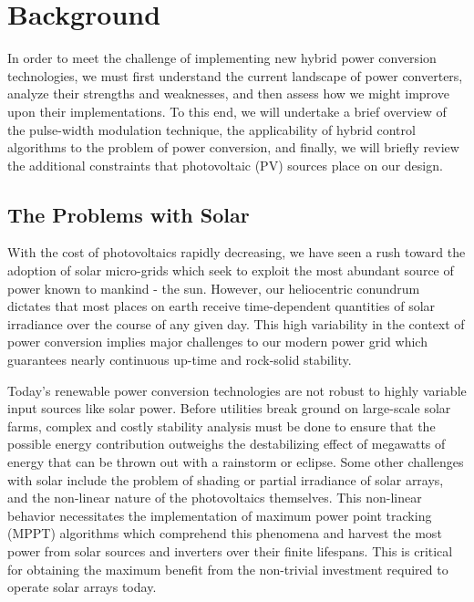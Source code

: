 \section{Background}
In order to meet the challenge of implementing new hybrid power conversion technologies, we must first understand the current landscape of power converters, analyze their strengths and weaknesses, and then assess how we might improve upon their implementations. To this end, we will undertake a brief overview of the pulse-width modulation technique, the applicability of hybrid control algorithms to the problem of power conversion, and finally, we will briefly review the additional constraints that photovoltaic (PV) sources place on our design. 

\subsection{The Problems with Solar}
With the cost of photovoltaics rapidly decreasing, we have seen a rush toward the adoption of solar micro-grids which seek to exploit the most abundant source of power known to mankind - the sun. However, our heliocentric conundrum dictates that most places on earth receive time-dependent quantities of solar irradiance over the course of any given day. This high variability in the context of power conversion implies major challenges to our modern power grid which guarantees nearly continuous up-time and rock-solid stability. 

Today's renewable power conversion technologies are not robust to highly variable input sources like solar power. Before utilities break ground on large-scale solar farms, complex and costly stability analysis must be done to ensure that the possible energy contribution outweighs the destabilizing effect of megawatts of energy that can be thrown out with a rainstorm or eclipse. Some other challenges with solar include  the problem of shading or partial irradiance of solar arrays, and the non-linear nature of the photovoltaics themselves. This non-linear behavior necessitates the implementation of maximum power point tracking (MPPT) algorithms which comprehend this phenomena and harvest the most power from solar sources and inverters over their finite lifespans. This is critical for obtaining the maximum benefit from the non-trivial investment required to operate solar arrays today. 

